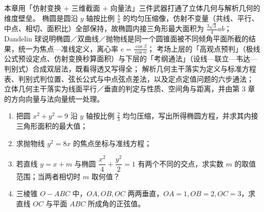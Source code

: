 \begin{explore}
\begin{summary}
本章用「仿射变换 $+$ 三维截面 $+$ 向量法」三件武器打通了立体几何与解析几何的维度壁垒。
椭圆是圆沿 $y$ 轴按比例 $\frac{b}{a}$ 的均匀压缩像，仿射不变量（共线、平行、中点、相切、面积比）全部保持，故椭圆内接三角形最大面积为 $\frac{3\sqrt3}{4}ab$；
Dandelin 球说明椭圆／双曲线／抛物线是同一个圆锥面被不同倾角平面所截的结果，统一为焦点—准线定义，离心率 $e=\frac{\cos\beta}{\cos\alpha}$；
考场上层的「高观点预判」（极线公式预设定点、仿射变换秒算面积）与下层的「考纲通法」（设线—联立—韦达—判别式）合成双层法，既看得透又写得全；
解析几何主干落实为定义与标准方程表、判别式判位置、弦长公式与中点弦点差法，以及定点定值问题的六步通法；
立体几何主干落实为线面平行／垂直的判定与性质、空间角与距离，并由第 3 章的方向向量与法向量统一处理。
\end{summary}

\end{explore}

\begin{inclasstest}
\begin{enumerate}
  \item 把圆 $x^2+y^2=9$ 沿 $y$ 轴按比例 $\frac23$ 均匀压缩，写出所得椭圆方程，并求其内接三角形面积的最大值；
  \item 求抛物线 $y^2=8x$ 的焦点坐标与准线方程；
  \item 若直线 $y=x+m$ 与椭圆 $\dfrac{x^2}{4}+\dfrac{y^2}{2}=1$ 有两个不同的交点，求实数 $m$ 的取值范围；当两者相切时 $m$ 取何值？
  \item 三棱锥 $O-ABC$ 中，$OA,OB,OC$ 两两垂直，$OA=1,OB=2,OC=3$，求直线 $OC$ 与平面 $ABC$ 所成角的正弦值。
\end{enumerate}
\end{inclasstest}


